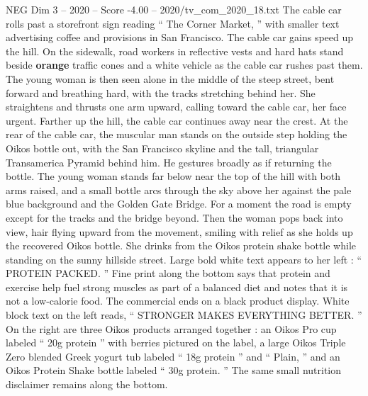 \begin{textsample}{NEG Dim 3 – 2020 – Score -4.00 – 2020/tv\_com\_2020\_18.txt}
The cable car rolls past a storefront sign reading “ The Corner Market, ” with smaller text advertising coffee and provisions in San Francisco.
The cable car gains speed up the hill.
On the sidewalk, road workers in reflective vests and hard hats stand beside \textbf{orange} traffic cones and a white vehicle as the cable car rushes past them.
The young woman is then seen alone in the middle of the steep street, bent forward and breathing hard, with the tracks stretching behind her.
She straightens and thrusts one arm upward, calling toward the cable car, her face urgent.
Farther up the hill, the cable car continues away near the crest.
At the rear of the cable car, the muscular man stands on the outside step holding the Oikos bottle out, with the San Francisco skyline and the tall, triangular Transamerica Pyramid behind him.
He gestures broadly as if returning the bottle.
The young woman stands far below near the top of the hill with both arms raised, and a small bottle arcs through the sky above her against the pale blue background and the Golden Gate Bridge.
For a moment the road is empty except for the tracks and the bridge beyond.
Then the woman pops back into view, hair flying upward from the movement, smiling with relief as she holds up the recovered Oikos bottle.
She drinks from the Oikos protein shake bottle while standing on the sunny hillside street.
Large bold white text appears to her left : “ PROTEIN PACKED. ” Fine print along the bottom says that protein and exercise help fuel strong muscles as part of a balanced diet and notes that it is not a low-calorie food.
The commercial ends on a black product display.
White block text on the left reads, “ STRONGER MAKES EVERYTHING BETTER. ” On the right are three Oikos products arranged together : an Oikos Pro cup labeled “ 20g protein ” with berries pictured on the label, a large Oikos Triple Zero blended Greek yogurt tub labeled “ 18g protein ” and “ Plain, ” and an Oikos Protein Shake bottle labeled “ 30g protein. ” The same small nutrition disclaimer remains along the bottom.

\end{textsample}
